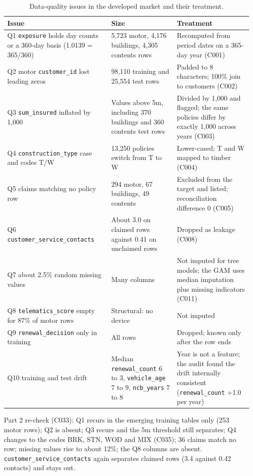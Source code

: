 \begin{table}[h]
\centering
\small
\begin{tabular}{p{4.6cm}p{4.0cm}p{6.0cm}}
\hline
Issue & Size & Treatment\\
\hline
Q1 \texttt{exposure} holds day counts or a 360-day basis (1.0139 = 365/360) & 5,723 motor, 4,176 buildings, 4,305 contents rows & Recomputed from period dates on a 365-day year (C001)\\
Q2 motor \texttt{customer\_id} lost leading zeros & 98,110 training and 25,554 test rows & Padded to 8 characters; 100\% join to customers (C002)\\
Q3 \texttt{sum\_insured} inflated by 1,000 & Values above 5m, including 370 buildings and 360 contents test rows & Divided by 1,000 and flagged; the same policies differ by exactly 1,000 across years (C003)\\
Q4 \texttt{construction\_type} case and codes T/W & 13,250 policies switch from T to W & Lower-cased; T and W mapped to timber (C004)\\
Q5 claims matching no policy row & 294 motor, 67 buildings, 49 contents & Excluded from the target and listed; reconciliation difference 0 (C005)\\
Q6 \texttt{customer\_service\_contacts} & About 3.0 on claimed rows against 0.41 on unclaimed rows & Dropped as leakage (C008)\\
Q7 about 2.5\% random missing values & Many columns & Not imputed for tree models; the GAM uses median imputation plus missing indicators (C011)\\
Q8 \texttt{telematics\_score} empty for 87\% of motor rows & Structural: no device & Not imputed\\
Q9 \texttt{renewal\_decision} only in training & All rows & Dropped; known only after the row ends\\
Q10 training and test drift & Median \texttt{renewal\_count} 6 to 3, \texttt{vehicle\_age} 7 to 9, \texttt{ncb\_years} 7 to 8 & Year is not a feature; the audit found the drift internally consistent (\texttt{renewal\_count} +1.0 per year)\\
\hline
\end{tabular}
\caption{Data-quality issues in the developed market and their treatment.}
\label{ov:tab-dq}
\end{table}

Part 2 re-check (C033): Q1 recurs in the emerging training tables only (253 motor rows); Q2 is absent; Q3 recurs and
the 5m threshold still separates; Q4 changes to the codes BRK, STN, WOD and MIX (C035); 36 claims match no row; missing
values rise to about 12\%; the Q8 columns are absent. \texttt{customer\_service\_contacts} again separates claimed rows
(3.4 against 0.42 contacts) and stays out.

